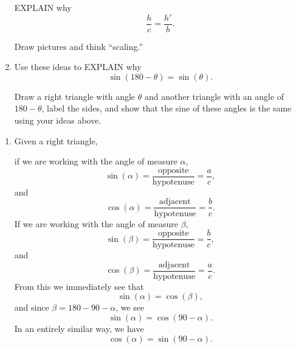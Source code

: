 \documentclass[noauthor,nooutcomes,hints,handout]{ximera}
\begin{document}
\begin{question}
\begin{enumerate}
\begin{center}
      \end{center}
      EXPLAIN why
      \[
      \frac{h}{c} = \frac{h'}{b}.
      \]
      \begin{hint}
        Draw pictures and think ``scaling.''
      \end{hint}
    \item Use these ideas to EXPLAIN why
      \[
      \sin(180-\theta) = \sin(\theta).
      \]
      \begin{hint}
        Draw a right triangle with angle $\theta$ and another triangle
        with an angle of $180-\theta$, label the sides, and show that
        the sine of these angles is the same using your ideas above.
      \end{hint}
  \end{enumerate}
  \begin{freeResponse}
    \begin{enumerate}
    \item Given a right triangle,
      \begin{center}
      \end{center}
      if we are working with the angle of measure $\alpha$,
      \[
      \sin(\alpha) = \frac{\text{opposite}}{\text{hypotenuse}} = \frac{a}{c},
      \]
      and
    \[
    \cos(\alpha) = \frac{\text{adjacent}}{\text{hypotenuse}} = \frac{b}{c}.
    \]
    If we are working with the angle of measure $\beta$,
    \[
    \sin(\beta) = \frac{\text{opposite}}{\text{hypotenuse}} = \frac{b}{c},
    \]
    and
    \[
    \cos(\beta) = \frac{\text{adjacent}}{\text{hypotenuse}} = \frac{a}{c}.
    \]
    From this we immediately see that
    \[
    \sin(\alpha) = \cos(\beta),
    \]
    and since $\beta = 180-90-\alpha$, we see
    \[
    \sin(\alpha) = \cos(90-\alpha).
    \]
    In an entirely similar way, we have
    \[
    \cos(\alpha) = \sin(90-\alpha).
    \]


\end{enumerate}
\end{freeResponse}
\end{question}
\end{document}
